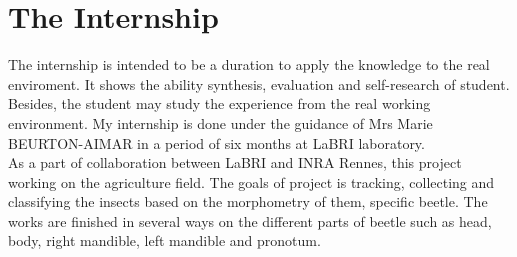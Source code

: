 \section{The Internship}
The internship is intended to be a duration to apply the knowledge to the real enviroment. It shows the ability synthesis, evaluation and self-research of student. Besides, the student may study the experience from the real working environment. My internship is done under the guidance of Mrs Marie BEURTON-AIMAR in a period of six months at LaBRI laboratory.\\[0.2cm]
As a part of collaboration between LaBRI and INRA Rennes, this project working on the agriculture field. The goals of project is tracking, collecting and classifying the insects based on the morphometry of them, specific beetle. The works are finished in several ways on the different parts of beetle such as head, body, right mandible, left mandible and pronotum. 
